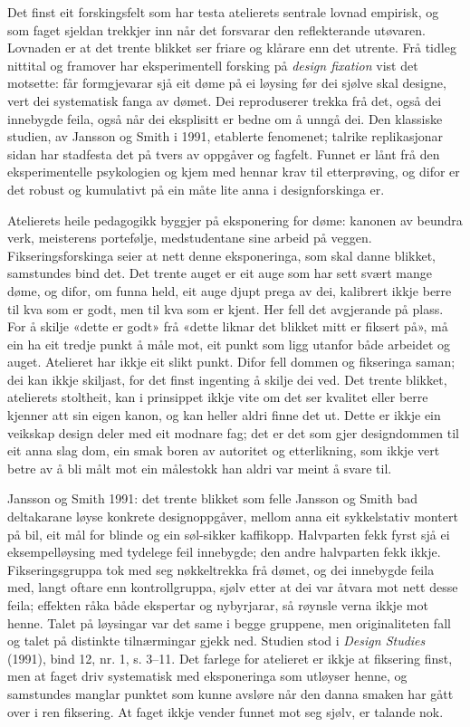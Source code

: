 Det finst eit forskingsfelt som har testa atelierets sentrale lovnad empirisk, og som faget sjeldan trekkjer inn når det forsvarar den reflekterande utøvaren. Lovnaden er at det trente blikket ser friare og klårare enn det utrente. Frå tidleg nittital og framover har eksperimentell forsking på \emph{design fixation} vist det motsette: får formgjevarar sjå eit døme på ei løysing før dei sjølve skal designe, vert dei systematisk fanga av dømet. Dei reproduserer trekka frå det, også dei innebygde feila, også når dei eksplisitt er bedne om å unngå dei. Den klassiske studien, av Jansson og Smith i 1991, etablerte fenomenet; talrike replikasjonar sidan har stadfesta det på tvers av oppgåver og fagfelt. Funnet er lånt frå den eksperimentelle psykologien og kjem med hennar krav til etterprøving, og difor er det robust og kumulativt på ein måte lite anna i designforskinga er.

Atelierets heile pedagogikk byggjer på eksponering for døme: kanonen av beundra verk, meisterens portefølje, medstudentane sine arbeid på veggen. Fikseringsforskinga seier at nett denne eksponeringa, som skal danne blikket, samstundes bind det. Det trente auget er eit auge som har sett svært mange døme, og difor, om funna held, eit auge djupt prega av dei, kalibrert ikkje berre til kva som er godt, men til kva som er kjent. Her fell det avgjerande på plass. For å skilje «dette er godt» frå «dette liknar det blikket mitt er fiksert på», må ein ha eit tredje punkt å måle mot, eit punkt som ligg utanfor både arbeidet og auget. Atelieret har ikkje eit slikt punkt. Difor fell dommen og fikseringa saman; dei kan ikkje skiljast, for det finst ingenting å skilje dei ved. Det trente blikket, atelierets stoltheit, kan i prinsippet ikkje vite om det ser kvalitet eller berre kjenner att sin eigen kanon, og kan heller aldri finne det ut. Dette er ikkje ein veikskap design deler med eit modnare fag; det er det som gjer designdommen til eit anna slag dom, ein smak boren av autoritet og etterlikning, som ikkje vert betre av å bli målt mot ein målestokk han aldri var meint å svare til.

\begin{kasus}{Jansson og Smith 1991: det trente blikket som felle}
Jansson og Smith bad deltakarane løyse konkrete designoppgåver, mellom anna eit sykkelstativ montert på bil, eit mål for blinde og ein søl-sikker kaffikopp. Halvparten fekk fyrst sjå ei eksempelløysing med tydelege feil innebygde; den andre halvparten fekk ikkje. Fikseringsgruppa tok med seg nøkkeltrekka frå dømet, og dei innebygde feila med, langt oftare enn kontrollgruppa, sjølv etter at dei var åtvara mot nett desse feila; effekten råka både ekspertar og nybyrjarar, så røynsle verna ikkje mot henne. Talet på løysingar var det same i begge gruppene, men originaliteten fall og talet på distinkte tilnærmingar gjekk ned. Studien stod i \textit{Design Studies} (1991), bind 12, nr. 1, s. 3--11. Det farlege for atelieret er ikkje at fiksering finst, men at faget driv systematisk med eksponeringa som utløyser henne, og samstundes manglar punktet som kunne avsløre når den danna smaken har gått over i ren fiksering. At faget ikkje vender funnet mot seg sjølv, er talande nok.
\end{kasus}

